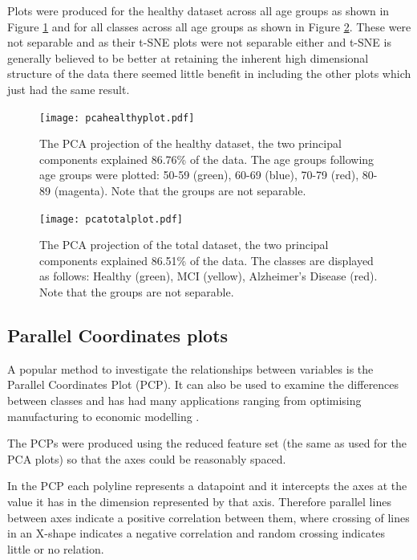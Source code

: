 Plots were produced for the healthy dataset across all age groups as shown in Figure \ref{fig:pcahealthyplot} and for all classes across all age groups as shown in Figure \ref{fig:pcatotalplot}. These were not separable and as their t-SNE plots were not separable either and t-SNE is generally believed to be better at retaining the inherent high dimensional structure of the data\cite{Bushati2011} there seemed little benefit in including the other plots which just had the same result.

\begin{figure}[h!]
  \centering
    \texttt{[image: pcahealthyplot.pdf]}
    \caption{The PCA projection of the healthy dataset, the two principal components explained 86.76\% of the data. The age groups following age groups were plotted: 50-59 (green), 60-69 (blue), 70-79 (red), 80-89 (magenta). Note that the groups are not separable.}
    \label{fig:pcahealthyplot}
\end{figure}

\begin{figure}[h!]
  \centering
    \texttt{[image: pcatotalplot.pdf]}
    \caption{The PCA projection of the total dataset, the two principal components explained 86.51\% of the data. The classes are displayed as follows: Healthy (green), MCI (yellow), Alzheimer's Disease (red). Note that the groups are not separable.}
    \label{fig:pcatotalplot}
\end{figure}


\clearpage
\subsection{Parallel Coordinates plots}

A popular method to investigate the relationships between variables is the Parallel Coordinates Plot (PCP). It can also be used to examine the differences between classes and has had many applications ranging from optimising manufacturing to economic modelling \cite{Inselberg1997}.

The PCPs were produced using the reduced feature set (the same as used for the PCA plots) so that the axes could be reasonably spaced.

In the PCP each polyline represents a datapoint and it intercepts the axes at the value it has in the dimension represented by that axis. Therefore parallel lines between axes indicate a positive correlation between them, where crossing of lines in an X-shape indicates a negative correlation and random crossing indicates little or no relation.\cite{Inselberg1997}

